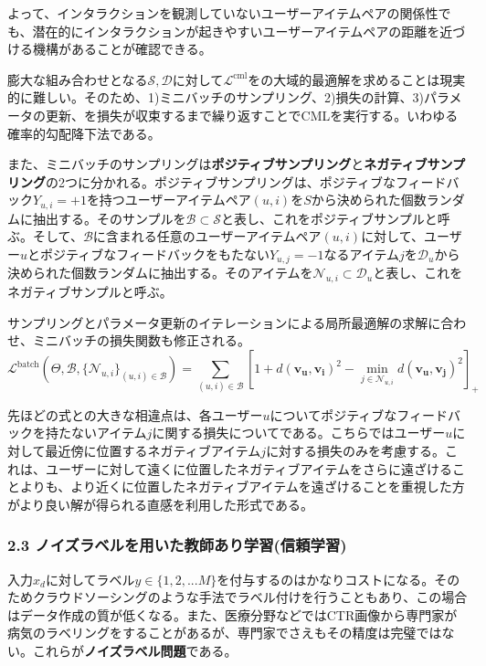 \documentclass[11pt,a4paper]{article}
\begin{document}
よって、インタラクションを観測していないユーザーアイテムペアの関係性でも、潜在的にインタラクションが起きやすいユーザーアイテムペアの距離を近づける機構があることが確認できる。

膨大な組み合わせとなる$\mathcal{S, D}$に対して$\mathcal{L}^{\text{cml}}$をの大域的最適解を求めることは現実的に難しい。そのため、1)ミニバッチのサンプリング、2)損失の計算、3)パラメータの更新、を損失が収束するまで繰り返すことでCMLを実行する。いわゆる確率的勾配降下法である。

また、ミニバッチのサンプリングは\textbf{ポジティブサンプリング}と\textbf{ネガティブサンプリング}の2つに分かれる。ポジティブサンプリングは、ポジティブなフィードバック$Y_{u,i} = +1$を持つユーザーアイテムペア$(u,i)$を$S$から決められた個数ランダムに抽出する。そのサンプルを$\mathcal{B} \subset \mathcal{S}$と表し、これをポジティブサンプルと呼ぶ。そして、$\mathcal{B}$に含まれる任意のユーザーアイテムペア$(u,i)$に対して、ユーザー$u$とポジティブなフィードバックをもたない$Y_{u,j} = -1$なるアイテム$j$を$\mathcal{D}_u$から決められた個数ランダムに抽出する。そのアイテムを$\mathcal{N}_{u,i} \subset \mathcal{D}_u$と表し、これをネガティブサンプルと呼ぶ。

サンプリングとパラメータ更新のイテレーションによる局所最適解の求解に合わせ、ミニバッチの損失関数も修正される。
$$
  \mathcal{L}^{\text{batch}}(\Theta, \mathcal{B}, \{\mathcal{N}_{u,i}\}_{(u,i) \in \mathcal{B}}) = \sum_{(u,i) \in \mathcal{B}} [1 + d(\mathbf{v_u}, \mathbf{v_i})^2 - \underset{j \in \mathcal{N}_{u,i}}{\min} d(\mathbf{v_u}, \mathbf{v_j})^2]_+
$$

先ほどの式との大きな相違点は、各ユーザー$u$についてポジティブなフィードバックを持たないアイテム$j$に関する損失についてである。こちらではユーザー$u$に対して最近傍に位置するネガティブアイテム$j$に対する損失のみを考慮する。これは、ユーザーに対して遠くに位置したネガティブアイテムをさらに遠ざけることよりも、より近くに位置したネガティブアイテムを遠ざけることを重視した方がより良い解が得られる直感を利用した形式である。

\subsubsection*{2.3 ノイズラベルを用いた教師あり学習(信頼学習)}

入力$x_d$に対してラベル$y \in \{ 1, 2, ... M\}$を付与するのはかなりコストになる。そのためクラウドソーシングのような手法でラベル付けを行うこともあり、この場合はデータ作成の質が低くなる。また、医療分野などではCTR画像から専門家が病気のラベリングをすることがあるが、専門家でさえもその精度は完璧ではない。これらが\textbf{ノイズラベル問題}である。
\end{document}
